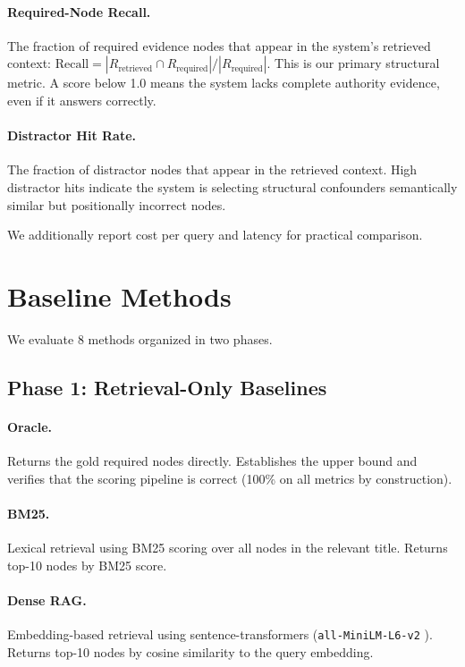 \documentclass[11pt]{article}
\begin{document}
\paragraph{Required-Node Recall.} The fraction of required evidence nodes that appear in the system's retrieved context: $\text{Recall} = |R_{\text{retrieved}} \cap R_{\text{required}}| / |R_{\text{required}}|$. This is our primary structural metric. A score below 1.0 means the system lacks complete authority evidence, even if it answers correctly.

\paragraph{Distractor Hit Rate.} The fraction of distractor nodes that appear in the retrieved context. High distractor hits indicate the system is selecting structural confounders semantically similar but positionally incorrect nodes.

We additionally report cost per query and latency for practical comparison.


\section{Baseline Methods}
\label{sec:baselines}

We evaluate 8 methods organized in two phases.

\subsection{Phase 1: Retrieval-Only Baselines}

\paragraph{Oracle.} Returns the gold required nodes directly. Establishes the upper bound and verifies that the scoring pipeline is correct (100\% on all metrics by construction).

\paragraph{BM25.} Lexical retrieval using BM25 scoring over all nodes in the relevant title. Returns top-10 nodes by BM25 score.

\paragraph{Dense RAG.} Embedding-based retrieval \citep{karpukhin2020dense} using sentence-transformers \citep{reimers2019sentencebert} (\texttt{all-MiniLM-L6-v2} \citep{wang2020minilm}). Returns top-10 nodes by cosine similarity to the query embedding.
\end{document}
